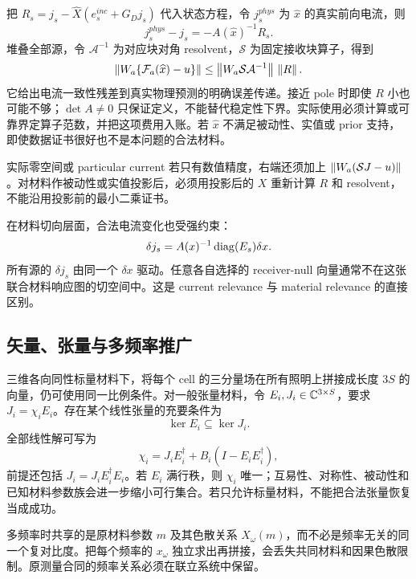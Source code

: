 把 $R_s=j_s-\widehat X(e_s^{inc}+G_Dj_s)$ 代入状态方程，令 $j_s^{phys}$ 为 $\widehat x$ 的真实前向电流，则
\begin{equation}
j_s^{phys}-j_s=-A(\widehat x)^{-1}R_s.
\end{equation}
堆叠全部源，令 $\mathcal A^{-1}$ 为对应块对角 resolvent，$\mathcal S$ 为固定接收块算子，得到
\begin{equation}
\left\lVert W_a\{{\mathcal F_a}(\widehat x)-u\}\right\rVert
\le \left\lVert W_a\mathcal S\mathcal A^{-1}\right\rVert\,\left\lVert R\right\rVert.\label{eq:physical-certificate}
\end{equation}
它给出电流一致性残差到真实物理预测的明确误差传递。接近 pole 时即使 $R$ 小也可能不够；$\det A\ne0$ 只保证定义，不能替代稳定性下界。实际使用必须计算或可靠界定算子范数，并把这项费用入账。若 $\widehat x$ 不满足被动性、实值或 prior 支持，即使数据证书很好也不是本问题的合法材料。

实际零空间或 particular current 若只有数值精度，右端还须加上 $\left\lVert W_a(\mathcal SJ-u)\right\rVert$。对材料作被动性或实值投影后，必须用投影后的 $X$ 重新计算 $R$ 和 resolvent，不能沿用投影前的最小二乘证书。

在材料切向层面，合法电流变化也受强约束：
\begin{equation}
\delta j_s=A(x)^{-1}\operatorname{diag}(E_s)\delta x.
\end{equation}
所有源的 $\delta j_s$ 由同一个 $\delta x$ 驱动。任意各自选择的 receiver-null 向量通常不在这张联合材料响应图的切空间中。这是 current relevance 与 material relevance 的直接区别。

\subsection{矢量、张量与多频率推广}

三维各向同性标量材料下，将每个 cell 的三分量场在所有照明上拼接成长度 $3S$ 的向量，仍可使用同一比例条件。对一般张量材料，令 $E_i,J_i\in\mathbb C^{3\times S}$，要求 $J_i=\chi_iE_i$。存在某个线性张量的充要条件为
\begin{equation}
\ker E_i\subseteq\ker J_i.
\end{equation}
全部线性解可写为
\begin{equation}
\chi_i=J_iE_i^\dagger+B_i(I-E_iE_i^\dagger),
\end{equation}
前提还包括 $J_i=J_iE_i^\dagger E_i$。若 $E_i$ 满行秩，则 $\chi_i$ 唯一；互易性、对称性、被动性和已知材料参数族会进一步缩小可行集合。若只允许标量材料，不能把合法张量恢复当成成功。

多频率时共享的是原材料参数 $m$ 及其色散关系 $X_\omega(m)$，而不必是频率无关的同一个复对比度。把每个频率的 $x_\omega$ 独立求出再拼接，会丢失共同材料和因果色散限制。原测量合同的频率关系必须在联立系统中保留。

